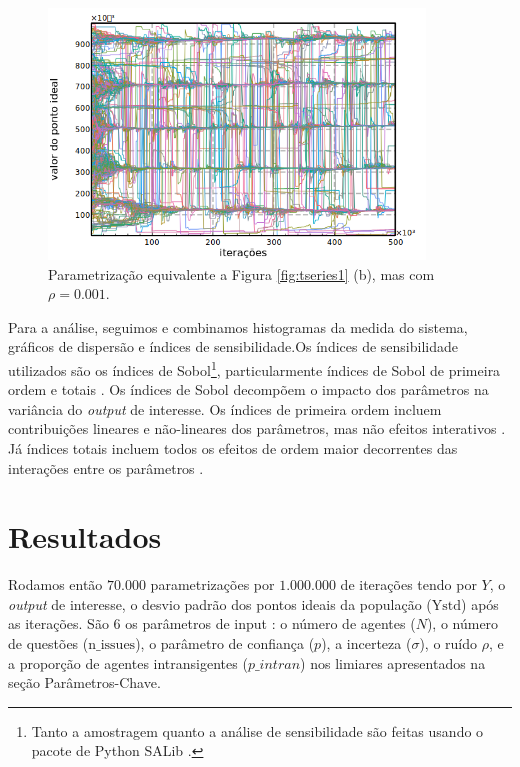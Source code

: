   \begin{figure}[H]
    \centering
    \includegraphics[width =10cm]{ims/ts5.png}
    \caption{Parametrização equivalente a Figura \ref{fig:tseries1} (b),
      mas com \(\rho = 0.001\).}
    \label{fig:nonnullrho}
  \end{figure}

  
Para a análise, seguimos  e combinamos
histogramas da medida do sistema, gráficos de dispersão e índices de
sensibilidade.Os índices de sensibilidade utilizados são os índices de
Sobol\footnote{Tanto a amostragem quanto a análise de sensibilidade são feitas
  usando o pacote de Python SALib \cite{herman2017salib}.}, particularmente
índices de Sobol de primeira ordem e totais \cite{saltelli2008global}. Os
índices de Sobol decompõem o impacto dos parâmetros na variância do
\textit{output} de interesse. Os índices de primeira ordem incluem contribuições
lineares e não-lineares dos parâmetros, mas não efeitos interativos
\cite{ten2016sensitivity}. Já índices totais incluem todos os efeitos de ordem
maior decorrentes das interações entre os parâmetros \cite{saltelli2008global}.

\section{Resultados}

Rodamos então \(70.000\) parametrizações por \(1.000.000\) de iterações tendo
por \(Y\), o \textit{output} de interesse, o desvio padrão  dos pontos ideais da
população (\(\text{Ystd}\)) após as iterações. São \(6\) os parâmetros de input
: o número de agentes (\(N\)), o número de questões (\(\text{n\_issues}\)), o
parâmetro de confiança (\(p\)), a incerteza (\(\sigma\)),  o ruído \(\rho\), e a
proporção de agentes intransigentes (\(p\_intran\)) nos
limiares apresentados na seção Parâmetros-Chave.


